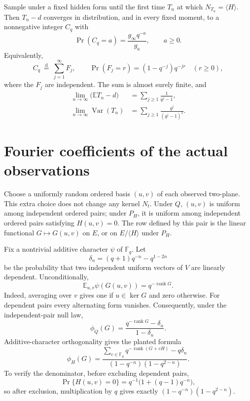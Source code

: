 \begin{corollary}\label{crit:overhead}
Sample under a fixed hidden form until the first time $T_n$ at which
$N_{T_n}=\langle H\rangle$. Then $T_n-d$ converges in distribution,
and in every fixed moment, to a nonnegative integer $C_q$ with
\[
 \Pr(C_q=a)=\frac{g_\infty q^{-a}}{g_a},\qquad a\ge0.
\]
Equivalently,
\[
 C_q\ \stackrel{\mathrm d}=\ \sum_{j=1}^{\infty}F_j,
 \qquad
 \Pr(F_j=r)=(1-q^{-j})q^{-jr}\quad(r\ge0),
\]
where the $F_j$ are independent. The sum is almost surely finite, and
\begin{align*}
 \lim_{n\to\infty}\bigl(\mathbb ET_n-d\bigr)
 &=\sum_{j\ge1}\frac1{q^j-1},\\
 \lim_{n\to\infty}\operatorname{Var}(T_n)
 &=\sum_{j\ge1}\frac{q^j}{(q^j-1)^2}.
\end{align*}
\end{corollary}

\section{Fourier coefficients of the actual observations}

Choose a uniformly random ordered basis $(u,v)$ of each observed
two-plane. This extra choice does not change any kernel $N_t$.
Under $Q$, $(u,v)$ is uniform among independent ordered pairs; under
$P_H$, it is uniform among independent ordered pairs satisfying
$H(u,v)=0$. The row defined by this pair is the linear functional
$G\mapsto G(u,v)$ on $E$, or on $E/\langle H\rangle$ under $P_H$.

Fix a nontrivial additive character $\psi$ of $\mathbb F_q$. Let
\[
 \delta_n=(q+1)q^{-n}-q^{1-2n}
\]
be the probability that two independent uniform vectors of $V$ are
linearly dependent. Unconditionally,
\begin{equation}\label{crit:basicFourier}
 \mathbb E_{u,v}\psi(G(u,v))=q^{-\operatorname{rank}G}.
\end{equation}
Indeed, averaging over $v$ gives one if $u\in\ker G$ and zero otherwise.
For dependent pairs every alternating form vanishes. Consequently,
under the independent-pair null law,
\begin{equation}\label{crit:nullFourier}
 \phi_Q(G)=
 \frac{q^{-\operatorname{rank}G}-\delta_n}{1-\delta_n}.
\end{equation}
Additive-character orthogonality gives the planted formula
\begin{equation}\label{crit:plantFourier}
 \phi_H(G)=
 \frac{\displaystyle\sum_{c\in\mathbb F_q}
 q^{-\operatorname{rank}(G+cH)}-q\delta_n}
 {(1-q^{-n})(1-q^{2-n})}.
\end{equation}
To verify the denominator, before excluding dependent pairs,
\[
 \Pr\{H(u,v)=0\}=q^{-1}\bigl(1+(q-1)q^{-n}\bigr),
\]
so after exclusion, multiplication by $q$ gives exactly
$(1-q^{-n})(1-q^{2-n})$.

